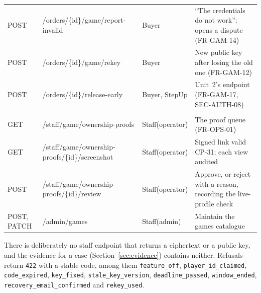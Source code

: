 \documentclass[11pt,a4paper]{article}
\begin{document}
{\begin{longtable}{@{}>{\ttfamily\raggedright\arraybackslash}p{1.55cm}>{\ttfamily\raggedright\arraybackslash}p{4.8cm}>{\raggedright\arraybackslash}p{2.4cm}>{\raggedright\arraybackslash}p{6.1cm}@{}}
POST & /\allowbreak orders/\allowbreak \{id\}/\allowbreak game/\allowbreak report-\allowbreak invalid & Buyer & ``The credentials do not work'': opens a dispute (FR-GAM-14) \\
POST & /\allowbreak orders/\allowbreak \{id\}/\allowbreak game/\allowbreak rekey & Buyer & New public key after losing the old one (FR-GAM-12) \\
POST & /\allowbreak orders/\allowbreak \{id\}/\allowbreak release-\allowbreak early & Buyer, StepUp & Unit~2's endpoint (FR-GAM-17, SEC-AUTH-08) \\
\multicolumn{4}{@{}l}{\textbf{Staff}} \\
GET & /\allowbreak staff/\allowbreak game/\allowbreak ownership-\allowbreak proofs & Staff(operator) & The proof queue (FR-OPS-01) \\
GET & /\allowbreak staff/\allowbreak game/\allowbreak ownership-\allowbreak proofs/\allowbreak \{id\}/\allowbreak screenshot & Staff(operator) & Signed link valid CP-31; each view audited \\
POST & /\allowbreak staff/\allowbreak game/\allowbreak ownership-\allowbreak proofs/\allowbreak \{id\}/\allowbreak review & Staff(operator) & Approve, or reject with a reason, recording the live-profile check \\
POST, PATCH & /\allowbreak admin/\allowbreak games & Staff(admin) & Maintain the games catalogue \\
\bottomrule
\end{longtable}
}

There is deliberately no staff endpoint that returns a ciphertext or a public key, and the evidence for a case (Section~\ref{sec:evidence}) contains neither. Refusals return \texttt{422} with a stable code, among them \texttt{feature\_off}, \texttt{player\_id\_claimed}, \texttt{code\_expired}, \texttt{key\_fixed}, \texttt{stale\_key\_version}, \texttt{deadline\_passed}, \texttt{window\_ended}, \texttt{recovery\_email\_confirmed} and \texttt{rekey\_used}.
\end{document}
